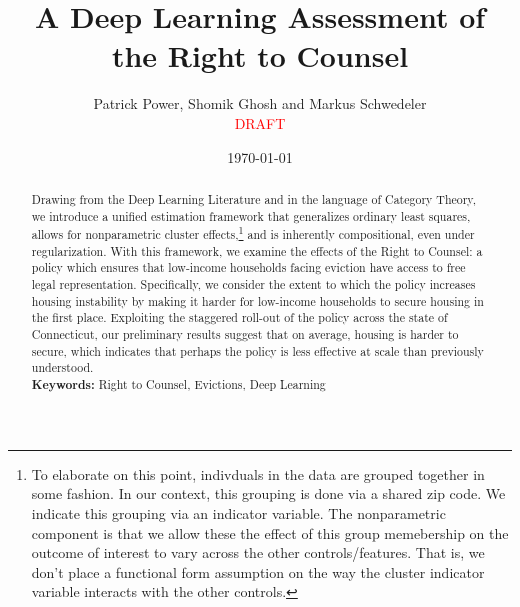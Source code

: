 \documentclass[a4paper,12pt]{article}
\begin{document}
\begin{titlepage}
\title{A Deep Learning Assessment of the Right to Counsel}

\author{Patrick Power, Shomik Ghosh and Markus Schwedeler \\ 
\textcolor{red}{DRAFT}}
\date{\today}
\maketitle
\thispagestyle{empty} %
\vspace{-2em}
\begin{abstract}
Drawing from the Deep Learning Literature and in the language of Category Theory, we introduce a unified estimation framework that generalizes ordinary least squares, allows for nonparametric cluster effects,\footnote{To elaborate on this point, indivduals in the data are grouped together in some fashion. In our context, this grouping is done via a shared zip code. We indicate this grouping via an indicator variable. The nonparametric component is that we allow these the effect of this group memebership on the outcome of interest to vary across the other controls/features. That is, we don't place a functional form assumption on the way the cluster indicator variable interacts with the other controls.} and is inherently compositional, even under regularization. With this framework, we examine the effects of the Right to Counsel: a policy which ensures that low-income households facing eviction have access to free legal representation. Specifically, we consider the extent to which the policy increases housing instability by making it harder for low-income households to secure housing in the first place. Exploiting the staggered roll-out of the policy across the state of Connecticut, our preliminary results suggest that on average, housing is harder to secure, which indicates that perhaps the policy is less effective at scale than previously understood. 
\vspace{0.2in}\\
\noindent\textbf{Keywords:} Right to Counsel, Evictions, Deep Learning\\
\end{abstract}
\setcounter{page}{1}
\end{titlepage}


\end{document}
